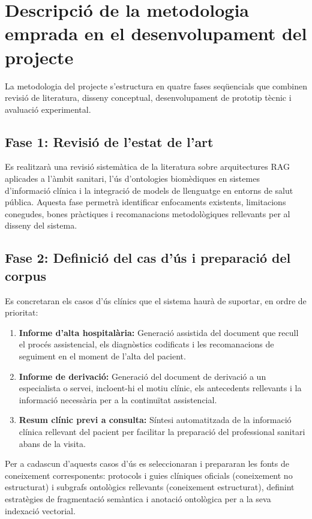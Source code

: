 \documentclass[CAT]{TFUOC}%
\begin{document}
\section{Descripció de la metodologia emprada en el desenvolupament del projecte}

La metodologia del projecte s'estructura en quatre fases seqüencials que combinen revisió de literatura, disseny conceptual, desenvolupament de prototip tècnic i avaluació experimental.

\subsection*{Fase 1: Revisió de l'estat de l'art}
Es realitzarà una revisió sistemàtica de la literatura sobre arquitectures RAG aplicades a l'àmbit sanitari, l'ús d'ontologies biomèdiques en sistemes d'informació clínica i la integració de models de llenguatge en entorns de salut pública. Aquesta fase permetrà identificar enfocaments existents, limitacions conegudes, bones pràctiques i recomanacions metodològiques rellevants per al disseny del sistema.

\subsection*{Fase 2: Definició del cas d'ús i preparació del corpus}
Es concretaran els casos d'ús clínics que el sistema haurà de suportar, en ordre de prioritat:

\begin{enumerate}
    \item \textbf{Informe d'alta hospitalària:} Generació assistida del document que recull el procés assistencial, els diagnòstics codificats i les recomanacions de seguiment en el moment de l'alta del pacient.
    
    \item \textbf{Informe de derivació:} Generació del document de derivació a un especialista o servei, incloent-hi el motiu clínic, els antecedents rellevants i la informació necessària per a la continuïtat assistencial.
    
    \item \textbf{Resum clínic previ a consulta:} Síntesi automatitzada de la informació clínica rellevant del pacient per facilitar la preparació del professional sanitari abans de la visita.
\end{enumerate}

Per a cadascun d'aquests casos d'ús es seleccionaran i prepararan les fonts de coneixement corresponents: protocols i guies clíniques oficials (coneixement no estructurat) i subgrafs ontològics rellevants (coneixement estructurat), definint estratègies de fragmentació semàntica i anotació ontològica per a la seva indexació vectorial.
\end{document}
